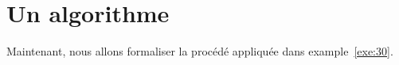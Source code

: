 




\section{Un algorithme }
\label{sec:un-algorithme}

Maintenant, nous allons formaliser la procédé appliquée dans example~\ref{exe:30}. 
